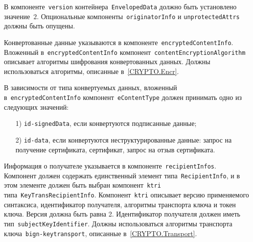 В компоненте~\texttt{version} контейнера~\texttt{EnvelopedData} 
должно быть установлено значение~$2$. Опциональные 
компоненты~\texttt{originatorInfo} и \texttt{unprotectedAttrs} должны быть 
опущены. 

Конвертованные данные указываются в компоненте~\texttt{encryptedContentInfo}.
%
Вложенный в~\texttt{encryptedContentInfo} компонент~\texttt{contentEncryptionAlgorithm}
описывает алгоритмы шифрования конвертованных данных. Должны использоваться алгоритмы, 
описанные в~\ref{CRYPTO.Encr}.

В зависимости от типа конвертуемых данных, вложенный 
в~\texttt{encryptedContentInfo} компонент~\texttt{eContentType} 
должен принимать одно из следующих значений:
\begin{enumerate}
\item[1)]
\texttt{id-signedData}, если конвертуются подписанные данные;
\item[2)]
\texttt{id-data}, если конвертуются неструктурированные данные:
запрос на получение сертификата, сертификат, запрос на отзыв сертификата.
\end{enumerate}

Информация о получателе указывается в компоненте~\texttt{recipientInfos}.
Компонент должен содержать единственный элемент 
типа~\texttt{RecipientInfo}, и в этом элементе должен быть выбран  
компонент~\texttt{ktri} типа~\texttt{KeyTransRecipientInfo}.  
Компонент~\texttt{ktri} описывает версию применяемого синтаксиса, 
идентификатор получателя, алгоритмы транспорта ключа и токен ключа. 
Версия должна быть равна 2. Идентификатор получателя должен 
иметь тип~\texttt{subjectKeyIdentifier}. Должны использоваться алгоритмы 
транспорта ключа~\texttt{bign-keytransport}, описанные 
в~\ref{CRYPTO.Transport}.
